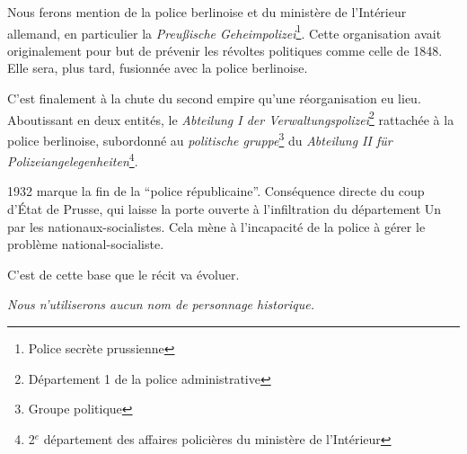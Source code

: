 Nous ferons mention de la police berlinoise et du ministère de l'Intérieur allemand, 
en particulier la \textit{Preußische Geheimpolizei}\footnote{Police secrète prussienne}.
Cette organisation avait originalement pour but de prévenir les révoltes politiques comme celle de 1848.
Elle sera, plus tard, fusionnée avec la police berlinoise. 
\medskip

C'est finalement à la chute du second empire qu'une réorganisation eu lieu. 
Aboutissant en deux entités, le \textit{Abteilung I der Verwaltungspolizei}\footnote{Département 1 de la police administrative}
rattachée à la police berlinoise, subordonné au \textit{politische gruppe}\footnote{Groupe politique} du \textit{Abteilung II für Polizeiangelegenheiten}\footnote{2$^e$ département des affaires policières du ministère de l'Intérieur}.
\medskip

1932 marque la fin de la \enquote{police républicaine}. Conséquence directe du coup d'État de Prusse, 
qui laisse la porte ouverte à l'infiltration du département Un par les nationaux-socialistes. 
Cela mène à l'incapacité de la police à gérer le problème national-socialiste.

\bigskip

C'est de cette base que le récit va évoluer.

\textit{Nous n'utiliserons aucun nom de personnage historique.}